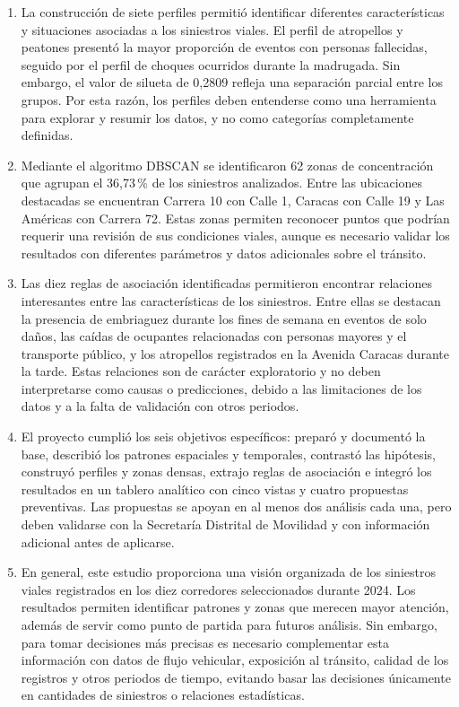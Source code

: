 \documentclass[12pt,letterpaper]{article}
\begin{document}
\begin{enumerate}[leftmargin=*,itemsep=6pt]
\item La construcción de siete perfiles permitió identificar diferentes características y situaciones asociadas a los siniestros viales. El perfil de atropellos y peatones presentó la mayor proporción de eventos con personas fallecidas, seguido por el perfil de choques ocurridos durante la madrugada. Sin embargo, el valor de silueta de 0,2809 refleja una separación parcial entre los grupos. Por esta razón, los perfiles deben entenderse como una herramienta para explorar y resumir los datos, y no como categorías completamente definidas.

\item Mediante el algoritmo DBSCAN se identificaron 62 zonas de concentración que agrupan el 36,73\,\% de los siniestros analizados. Entre las ubicaciones destacadas se encuentran Carrera 10 con Calle 1, Caracas con Calle 19 y Las Américas con Carrera 72. Estas zonas permiten reconocer puntos que podrían requerir una revisión de sus condiciones viales, aunque es necesario validar los resultados con diferentes parámetros y datos adicionales sobre el tránsito.

\item Las diez reglas de asociación identificadas permitieron encontrar relaciones interesantes entre las características de los siniestros. Entre ellas se destacan la presencia de embriaguez durante los fines de semana en eventos de solo daños, las caídas de ocupantes relacionadas con personas mayores y el transporte público, y los atropellos registrados en la Avenida Caracas durante la tarde. Estas relaciones son de carácter exploratorio y no deben interpretarse como causas o predicciones, debido a las limitaciones de los datos y a la falta de validación con otros periodos.

\item El proyecto cumplió los seis objetivos específicos: preparó y documentó la base, describió los patrones espaciales y temporales, contrastó las hipótesis, construyó perfiles y zonas densas, extrajo reglas de asociación e integró los resultados en un tablero analítico con cinco vistas y cuatro propuestas preventivas. Las propuestas se apoyan en al menos dos análisis cada una, pero deben validarse con la Secretaría Distrital de Movilidad y con información adicional antes de aplicarse.

\item En general, este estudio proporciona una visión organizada de los siniestros viales registrados en los diez corredores seleccionados durante 2024. Los resultados permiten identificar patrones y zonas que merecen mayor atención, además de servir como punto de partida para futuros análisis. Sin embargo, para tomar decisiones más precisas es necesario complementar esta información con datos de flujo vehicular, exposición al tránsito, calidad de los registros y otros periodos de tiempo, evitando basar las decisiones únicamente en cantidades de siniestros o relaciones estadísticas.

\end{enumerate}
\end{document}

